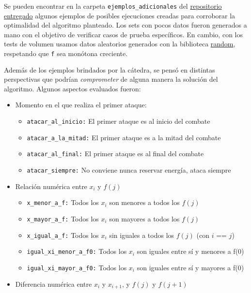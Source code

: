 \documentclass{article}
\begin{document}
Se pueden encontrar en la carpeta \texttt{ejemplos\_adicionales} del \href{https://github.com/La-sociedad-del-silencio/TP2-Dinamica}{repositorio entregado} algunos ejemplos de posibles ejecuciones creadas para corroborar la optimalidad del algoritmo planteado. Los sets con pocos datos fueron generados a mano con el objetivo de verificar casos de prueba específicos. En cambio, con los tests de volumen usamos datos aleatorios generados con la biblioteca \href{https://docs.python.org/es/3/library/random.html}{random}, respetando que \texttt{f} sea monótona creciente.

Además de los ejemplos brindados por la cátedra, se pensó en distintas perspectivas que podrían \textit{comprometer} de alguna manera la solución del algoritmo. Algunos aspectos evaluados fueron:

\begin{itemize}
    \item Momento en el que realiza el primer ataque:
    \begin{itemize}
        \item \texttt{atacar\_al\_inicio:} El primer ataque es al inicio del combate
        \item \texttt{atacar\_a\_la\_mitad:} El primer ataque es a la mitad del combate
        \item \texttt{atacar\_al\_final:} El primer ataque es al final del combate
        \item \texttt{atacar\_siempre:} No conviene nunca reservar energía, ataca siempre
    \end{itemize}
    \item Relación numérica entre $x_i$ y $f(j)$
        \begin{itemize}
        \item \texttt{x\_menor\_a\_f:} Todos los $x_i$ son menores a todos los $f(j)$
        \item \texttt{x\_mayor\_a\_f:} Todos los $x_i$ son mayores a todos los $f(j)$
        \item \texttt{x\_igual\_a\_f:} Todos los $x_i$ sin iguales a todos los $f(j)$ (con $i$ == $j$)
        \item \texttt{igual\_xi\_menor\_a\_f0:} Todos los $x_i$ son iguales entre sí y menores a f(0)
        \item \texttt{igual\_xi\_mayor\_a\_f0:} Todos los $x_i$ son iguales entre sí y mayores a f(0)
    \end{itemize}
    \item Diferencia numérica entre $x_i$ y $x_{i+1}$, y $f(j)$ y $f(j+1)$

\end{itemize}
\end{document}
